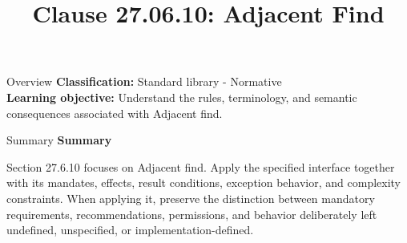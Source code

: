 \documentclass[10pt,letterpaper]{article}
\title{Clause 27.06.10: Adjacent Find}
\author{}
\date{}
\begin{document}
\maketitle
\begin{CornellOverviewBox}{Overview}
\textbf{Classification:} Standard library - Normative\\[2pt]
\textbf{Learning objective:} Understand the rules, terminology, and semantic consequences associated with Adjacent find.
\end{CornellOverviewBox}\begin{CornellSummaryBox}{Summary}
{\sffamily\bfseries\color{Accent} Summary}\par\vspace{3pt}Section 27.6.10 focuses on Adjacent find. Apply the specified interface together with its mandates, effects, result conditions, exception behavior, and complexity constraints. When applying it, preserve the distinction between mandatory requirements, recommendations, permissions, and behavior deliberately left undefined, unspecified, or implementation-defined.
\end{CornellSummaryBox}
\end{document}
